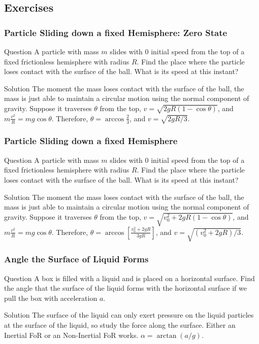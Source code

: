 \subsection{Exercises}
\begin{frame}
\frametitle{Particle Sliding down a fixed Hemisphere: Zero State}
\begin{block}{Question}
A particle with mass $m$ slides with 0 initial speed from the top of a \alert{fixed} frictionless hemisphere with radius $R$. Find the
place where the particle loses \alert{contact} with the surface of the ball. What is its \alert{speed} at this instant?
\end{block}
\begin{block}{Solution}
The moment the mass loses contact with the surface of the ball, the mass is just able to maintain a circular motion using the normal component of gravity. Suppose it traverses $\theta$ from the top, $v=\sqrt{2gR(1-\cos\theta)}$, and $m\frac{v^2}{R}=mg\cos\theta$. Therefore, $\theta=\arccos\frac{2}{3}$, and $v=\sqrt{2gR/3}$.
\end{block}
\end{frame}
\begin{frame}
\frametitle{Particle Sliding down a fixed Hemisphere}
\begin{block}{Question}
A particle with mass $m$ slides with 0 initial speed from the top of a \alert{fixed} frictionless hemisphere with radius $R$. Find the
place where the particle loses \alert{contact} with the surface of the ball. What is its \alert{speed} at this instant?
\end{block}
\begin{block}{Solution}
The moment the mass loses contact with the surface of the ball, the mass is just able to maintain a circular motion using the normal component of gravity. Suppose it traverses $\theta$ from the top, $v=\sqrt{v_0^2+2gR(1-\cos\theta)}$, and $m\frac{v^2}{R}=mg\cos\theta$. Therefore, $\theta=\arccos\left[\frac{v_0^2+2gR}{3gR}\right]$, and $v=\sqrt{(v_0^2+2gR)/3}$.
\end{block}
\end{frame}
\begin{frame}
\frametitle{Angle the Surface of Liquid Forms}
\begin{block}{Question}
A box is filled with a liquid and is placed on a horizontal surface. Find the angle that the surface of the liquid forms with the horizontal surface if we pull the box with acceleration $a$.
\end{block}
\begin{block}{Solution}
The surface of the liquid can only exert pressure on the liquid particles at the surface of the liquid, so study the force along the surface. Either an \alert{Inertial} FoR or an \alert{Non-Inertial} FoR works. $\alpha=\arctan(a/g)$.
\end{block}
\end{frame}
